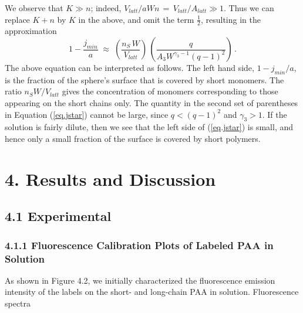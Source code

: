 \documentclass[journal=mamobx,manuscript=article]{achemso}
\begin{document}
We observe that $K\gg n$; indeed,  $V_{latt}/aWn \,=\,V_{latt}/A_{latt}\gg 1$.  
Thus we can replace $K+n$ by $K$ in the above, and omit the term $\frac{1}{2}$, resulting in the   
approximation 
\begin{equation}
    \label{eq.jstar}
     1-\frac{j_{min}}{a}     \; \approx   \; 
        \left(  \frac{n_S\,W}{V_{latt} }\right) \,\left(   \frac{q}{A_3W^{\gamma_3-1}(q-1)^2}\right)  \,.
\end{equation}
The above equation can be interpreted as follows.  The left hand side, $1-j_{min}/a$, is the fraction of the
sphere's surface that is covered by short monomers.  The ratio $n_SW/V_{latt}$ gives
the concentration of monomers corresponding to those appearing on the short chains only.
The quantity in the second set of 
parentheses in Equation (\ref{eq.jstar}) cannot be large, since $q<(q-1)^2$ and $\gamma_3>1$.
If the solution is fairly dilute, then we see that the left side of (\ref{eq.jstar}) is small,
and hence only a small fraction of the surface is covered by short polymers.



\section{4. Results and Discussion}

\subsection{4.1 Experimental}

\subsubsection{4.1.1 Fluorescence Calibration Plots of Labeled PAA in Solution}

As shown in Figure 4.2, we initially characterized the fluorescence emission intensity of the labels on the short- and long-chain PAA in solution.  Fluorescence spectra
\end{document}
